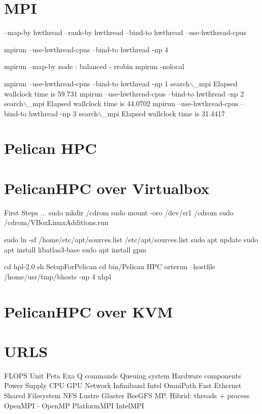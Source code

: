 \documentclass{article}
\begin{document}
\section*{MPI}

--map-by hwthread
--rank-by hwthread
--bind-to hwthread
--use-hwthread-cpus

mpirun --use-hwthread-cpus --bind-to hwthread -np 4

mpirun --map-by node    : balanced - rrobin
mpirun -nolocal

mpirun --use-hwthread-cpus --bind-to hwthread -np 1 search$\backslash$_mpi
  Elapsed wallclock time is 59.731
mpirun --use-hwthread-cpus --bind-to hwthread -np 2 search$\backslash$_mpi
  Elapsed wallclock time is 44.0702
mpirun --use-hwthread-cpus --bind-to hwthread -np 3 search$\backslash$_mpi
  Elapsed wallclock time is 31.4417

\section*{Pelican HPC}


\section*{PelicanHPC over Virtualbox}

First Steps ...
sudo mkdir /cdrom
sudo mount -oro /dev/sr1 /cdrom
sudo /cdrom/VBoxLinuxAdditions.run

sudo ln -sf /home/etc/apt/sources.list /etc/apt/sources.list
sudo apt update
sudo apt install libatlas3-base
sudo apt install gpm

cd hpl-2.0
sh SetupForPelican
cd bin/Pelican HPC
orterun --hostfile /home/usr/tmp/bhosts -np 4 xhpl

\section*{PelicanHPC over KVM}

\section*{URLS}


FLOPS Unit Peta Exa  
Q commands
Queuing system
Hardware components
Power Supply
CPU
GPU
Network
Infiniband
Intel OmniPath
Fast Ethernet
Shared Filesystem
NFS
Lustre Gluster BeeGFS
MP. Hibrid: threads + process
OpenMPI - OpenMP
PlatformMPI
IntelMPI
\end{document}
